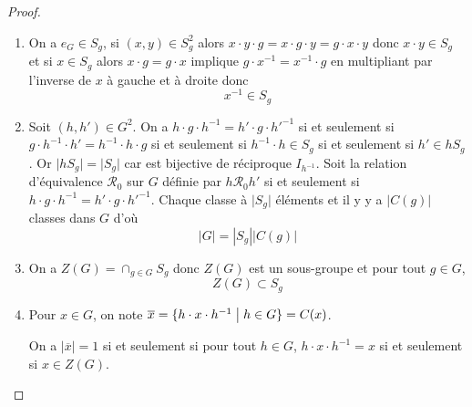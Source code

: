 \documentclass[12pt]{article}
\begin{document}
\begin{proof}
	\phantom{}
	\begin{enumerate}
		\item On a $e_{G}\in S_{g}$, si $(x,y)\in S_{g}^{2}$ alors $x\cdot y\cdot g=x\cdot g\cdot y=g\cdot x\cdot y$ donc $x\cdot y\in S_{g}$ et si $x\in S_{g}$ alors $x\cdot g=g\cdot x$ implique $g\cdot x^{-1}=x^{-1}\cdot g$ en multipliant par l'inverse de $x$ à gauche et à droite donc 
		\begin{equation}
			\boxed{x^{-1}\in S_{g}}
		\end{equation}
		
		\item Soit $(h,h')\in G^{2}$. On a $h\cdot g\cdot h^{-1}=h'\cdot g\cdot h'^{-1}$ si et seulement si $g\cdot h^{-1}\cdot h'=h^{-1}\cdot h\cdot g$ si et seulement si $h^{-1}\cdot h\in S_{g}$ si et seulement si $h'\in hS_{g}$. Or $\vert hS_{g}\vert=\vert S_{g}\vert$ car  est bijective de réciproque $I_{h^{-1}}$. Soit la relation d'équivalence $\mathcal{R}_{0}$ sur $G$ définie par $h\mathcal{R}_{0}h'$ si et seulement si $h\cdot g\cdot h^{-1}=h'\cdot g\cdot h'^{-1}$. Chaque classe à $\vert S_{g}\vert$ éléments et il y y a $\vert C(g)\vert$ classes dans $G$ d'où 
		\begin{equation}
			\boxed{\left\lvert G\right\rvert=\left\lvert S_{g}\right\rvert\left\lvert C(g)\right\rvert}
		\end{equation}
		
		\item On a $Z(G)=\cap_{g\in G}S_{g}$ donc $Z(G)$ est un sous-groupe et pour tout $g\in G$, 
		\begin{equation}
			\boxed{Z(G)\subset S_{g}}
		\end{equation}
		
		\item Pour $x\in G$, on note $\overline{x}=\{h\cdot x\cdot h^{-1}\bigm| h\in G\}=C(x)$. 
		
		On a $\vert\overline{x}\vert=1$ si et seulement si pour tout $h\in G$, $h\cdot x\cdot h^{-1}=x$ si et seulement si $x\in Z(G)$.
		

\end{enumerate}
\end{proof}
\end{document}
